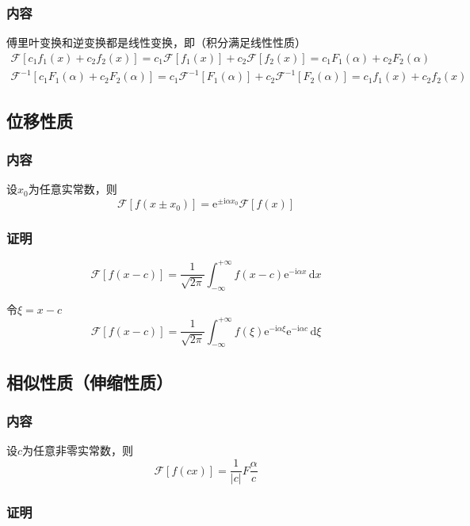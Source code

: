 \subsubsection{内容}

傅里叶变换和逆变换都是线性变换，即（积分满足线性性质）
\begin{gather*}
\mathscr{F}[c_1f_1(x)+c_2f_2(x)]=c_1\mathscr{F}[f_1(x)]+c_2\mathscr{F}[f_2(x)]=c_1F_1(\alpha)+c_2F_2(\alpha)\\
\mathscr{F}^{-1}[c_1F_1(\alpha)+c_2F_2(\alpha)]=c_1\mathscr{F}^{-1}[F_1(\alpha)]+c_2\mathscr{F}^{-1}[F_2(\alpha)]=c_1f_1(x)+c_2f_2(x)
\end{gather*}

\subsection{位移性质}

\subsubsection{内容}

设\(x_0\)为任意实常数，则
\[
\mathscr{F}[f(x\pm x_0)]=\mathrm{e}^{\pm\mathrm{i}\alpha x_0}\mathscr{F}[f(x)]
\]

\subsubsection{证明}
\[
\mathscr{F}[f(x-c)]=\frac{1}{\sqrt{2\pi}}\int_{-\infty}^{+\infty}{f(x-c)\mathrm{e}^{-\mathrm{i}\alpha x}\,\mathrm{d}x}
\]

令\(\xi=x-c\)
\[
\mathscr{F}[f(x-c)]=\frac{1}{\sqrt{2\pi}}\int_{-\infty}^{+\infty}f(\xi)\mathrm{e}^{-\mathrm{i}\alpha\xi}\mathrm{e}^{-\mathrm{i}\alpha c}\,\mathrm{d}\xi
\]

\subsection{相似性质（伸缩性质）}

\subsubsection{内容}

设\(c\)为任意非零实常数，则
\[
\mathscr{F}[f(cx)]=\frac{1}{|c|}F\frac{\alpha}{c}
\]

\subsubsection{证明}

